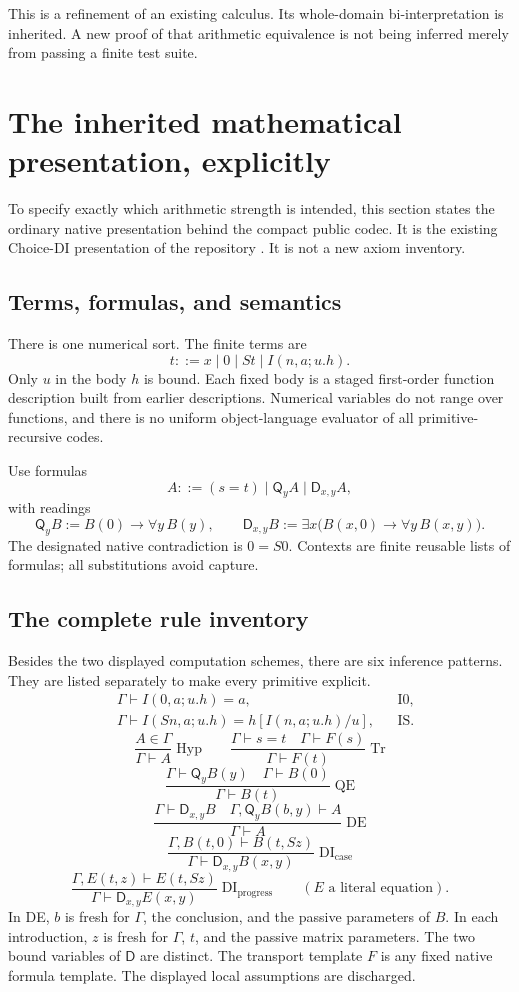 \documentclass[11pt,letterpaper]{article}
\theoremstyle{definition}
\newcommand{\D}{\mathsf D}
\newcommand{\Q}{\mathsf Q}
\newcommand{\one}{S0}
\begin{document}
This is a refinement of an existing calculus. Its whole-domain
bi-interpretation is inherited. A new proof of that arithmetic equivalence
is not being inferred merely from passing a finite test suite.

\section{The inherited mathematical presentation, explicitly}
To specify exactly which arithmetic strength is intended, this section
states the ordinary native presentation behind the compact public codec.
It is the existing Choice-DI presentation of the repository
\cite{choice,current}. It is not a new axiom inventory.

\subsection{Terms, formulas, and semantics}
There is one numerical sort. The finite terms are
\[
 t::=x\mid0\mid St\mid I(n,a;u.h).
\]
Only $u$ in the body $h$ is bound. Each fixed body is a staged first-order
function description built from earlier descriptions. Numerical variables
do not range over functions, and there is no uniform object-language
evaluator of all primitive-recursive codes.

Use formulas
\[
 A::=(s=t)\mid\Q_y A\mid\D_{x,y}A,
\]
with readings
\[
 \Q_yB:=B(0)\to\forall y\,B(y),\qquad
 \D_{x,y}B:=\exists x\bigl(B(x,0)\to\forall y\,B(x,y)\bigr).
\]
The designated native contradiction is $0=\one$. Contexts are finite
reusable lists of formulas; all substitutions avoid capture.

\subsection{The complete rule inventory}
Besides the two displayed computation schemes, there are six inference
patterns. They are listed separately to make every primitive explicit.
\begin{align*}
 &\Gamma\vdash I(0,a;u.h)=a, &&\text{I0},\\
 &\Gamma\vdash I(Sn,a;u.h)=h[I(n,a;u.h)/u], &&\text{IS}.
\end{align*}
\[
 \frac{A\in\Gamma}{\Gamma\vdash A}\;\mathrm{Hyp}
 \qquad
 \frac{\Gamma\vdash s=t\quad\Gamma\vdash F(s)}
      {\Gamma\vdash F(t)}\;\mathrm{Tr}
\]
\[
 \frac{\Gamma\vdash\Q_yB(y)\quad\Gamma\vdash B(0)}
      {\Gamma\vdash B(t)}\;\mathrm{QE}
\]
\[
 \frac{\Gamma\vdash\D_{x,y}B\quad
       \Gamma,\Q_yB(b,y)\vdash A}
      {\Gamma\vdash A}\;\mathrm{DE}
\]
\[
 \frac{\Gamma,B(t,0)\vdash B(t,Sz)}
      {\Gamma\vdash\D_{x,y}B(x,y)}\;\mathrm{DI}_{\mathrm{case}}
\]
\[
 \frac{\Gamma,E(t,z)\vdash E(t,Sz)}
      {\Gamma\vdash\D_{x,y}E(x,y)}\;\mathrm{DI}_{\mathrm{progress}}
 \qquad(E\text{ a literal equation}).
\]
In DE, $b$ is fresh for $\Gamma$, the conclusion, and the passive
parameters of $B$. In each introduction, $z$ is fresh for $\Gamma$, $t$,
and the passive matrix parameters. The two bound variables of $\D$ are
distinct. The transport template $F$ is any fixed native formula template.
The displayed local assumptions are discharged.
\end{document}
